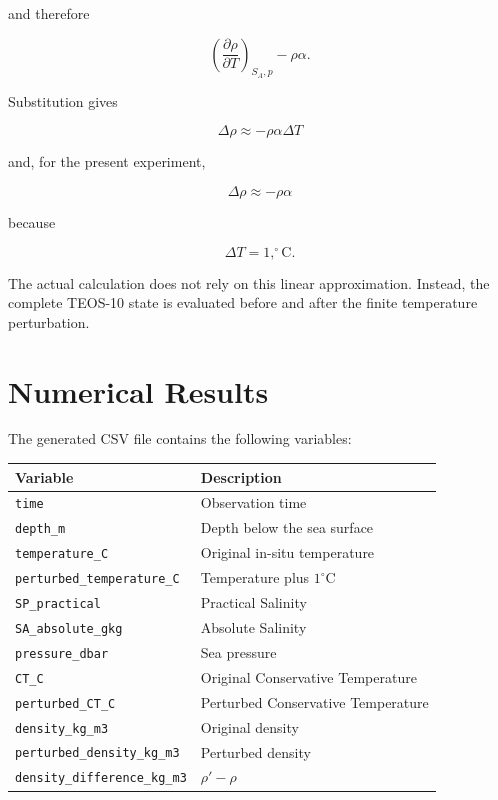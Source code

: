 \documentclass[11pt]{article}
\begin{document}
and therefore

\begin{equation}
\left(
\frac{\partial\rho}{\partial T}
\right)_{S_A,p}
-\rho\alpha.
\end{equation}

Substitution gives

\begin{equation}
\boxed{
\Delta\rho
\approx
-\rho\alpha\Delta T
}
\end{equation}

and, for the present experiment,

\begin{equation}
\boxed{
\Delta\rho
\approx
-\rho\alpha
}
\end{equation}

because

\begin{equation}
\Delta T=1,^\circ\mathrm{C}.
\end{equation}

The actual calculation does not rely on this linear approximation.
Instead, the complete TEOS-10 state is evaluated before and after the
finite temperature perturbation.

\section{Numerical Results}

The generated CSV file contains the following variables:

\begin{center}
\begin{tabular}{ll}
\toprule
Variable & Description \\
\midrule
\texttt{time} & Observation time \\
\texttt{depth\_m} & Depth below the sea surface \\
\texttt{temperature\_C} & Original in-situ temperature \\
\texttt{perturbed\_temperature\_C} & Temperature plus $1^\circ\mathrm{C}$ \\
\texttt{SP\_practical} & Practical Salinity \\
\texttt{SA\_absolute\_gkg} & Absolute Salinity \\
\texttt{pressure\_dbar} & Sea pressure \\
\texttt{CT\_C} & Original Conservative Temperature \\
\texttt{perturbed\_CT\_C} & Perturbed Conservative Temperature \\
\texttt{density\_kg\_m3} & Original density \\
\texttt{perturbed\_density\_kg\_m3} & Perturbed density \\
\texttt{density\_difference\_kg\_m3} & $\rho'-\rho$ \\
\bottomrule
\end{tabular}
\end{center}
\end{document}

